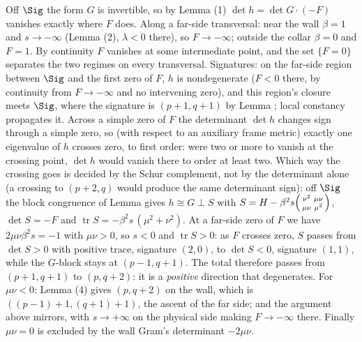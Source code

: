Off $\Sig$ the form $G$ is invertible, so by Lemma (1) $\det h = \det G \cdot (-F)$ vanishes exactly where $F$ does. Along a far-side transversal: near the wall $\beta = 1$ and $s \to -\infty$ (Lemma (2), $\lambda < 0$ there), so $F \to -\infty$; outside the collar $\beta = 0$ and $F = 1$. By continuity $F$ vanishes at some intermediate point, and the set $\{F = 0\}$ separates the two regimes on every transversal. Signatures: on the far-side region between $\Sig$ and the first zero of $F$, $h$ is nondegenerate ($F < 0$ there, by continuity from $F \to -\infty$ and no intervening zero), and this region's closure meets $\Sig$, where the signature is $(p{+}1,q{+}1)$ by Lemma ; local constancy propagates it. Across a simple zero of $F$ the determinant $\det h$ changes sign through a simple zero, so (with respect to an auxiliary frame metric) exactly one eigenvalue of $h$ crosses zero, to first order: were two or more to vanish at the crossing point, $\det h$ would vanish there to order at least two. Which way the crossing goes is decided by the Schur complement, not by the determinant alone (a crossing to $(p{+}2, q)$ would produce the same determinant sign): off $\Sig$ the block congruence of Lemma  gives $h \cong G \perp S$ with $S = H - \beta^2 s \begin{psmallmatrix} \nu^2 & \mu\nu \\ \mu\nu & \mu^2 \end{psmallmatrix}$, $\det S = -F$ and $\operatorname{tr} S = -\beta^2 s\,(\mu^2 + \nu^2)$. At a far-side zero of $F$ we have $2\mu\nu\beta^2 s = -1$ with $\mu\nu > 0$, so $s < 0$ and $\operatorname{tr} S > 0$: as $F$ crosses zero, $S$ passes from $\det S > 0$ with positive trace, signature $(2,0)$, to $\det S < 0$, signature $(1,1)$, while the $G$-block stays at $(p{-}1, q{+}1)$. The total therefore passes from $(p{+}1, q{+}1)$ to $(p, q{+}2)$: it is a \emph{positive} direction that degenerates. For $\mu\nu < 0$: Lemma (4) gives $(p, q{+}2)$ on the wall, which is $((p{-}1){+}1, (q{+}1){+}1)$, the ascent of the far side; and the argument above mirrors, with $s \to +\infty$ on the physical side making $F \to -\infty$ there. Finally $\mu\nu = 0$ is excluded by the wall Gram's determinant $-2\mu\nu$.
